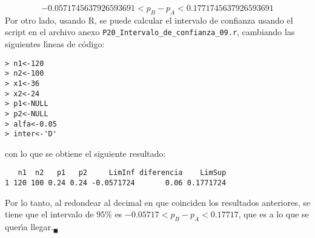 \begin{solucion}
\begin{equation*}
  -0.0571745637926593691 < p_B - p_A < 0.1771745637926593691
 \end{equation*}
 Por otro lado, usando R, se puede calcular el intervalo de confianza usando el script en el archivo anexo \texttt{P20\_Intervalo\_de\_confianza\_09.r}, cambiando las siguientes l\'{\i}neas de c\'odigo:
 \begin{verbatim}
> n1<-120
> n2<-100
> x1<-36
> x2<-24
> p1<-NULL
> p2<-NULL
> alfa<-0.05
> inter<-'D'
 \end{verbatim}
 \vspace{-0.5cm}
 con lo que se obtiene el siguiente resultado:
 \begin{verbatim}
   n1  n2   p1   p2     LimInf diferencia    LimSup
1 120 100 0.24 0.24 -0.0571724       0.06 0.1771724
 \end{verbatim}
 \vspace{-0.5cm}
 Por lo tanto, al redondear al decimal en que coinciden los resultados anteriores, se tiene que el intervalo de $95\%$ es $-0.05717 < p_B - p_A < 0.17717$, que es a lo que se quer\'{\i}a llegar.${}_{\blacksquare}$
\end{solucion}
